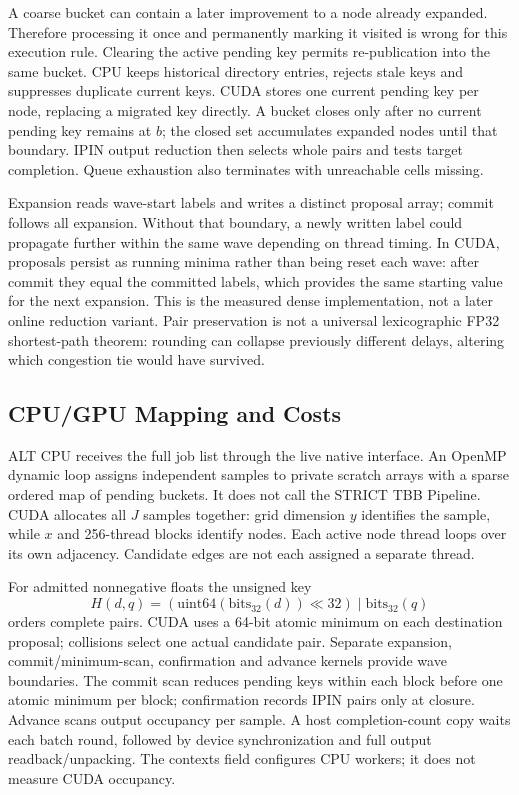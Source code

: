 A coarse bucket can contain a later improvement to a node already expanded. Therefore processing it once and permanently marking it visited is wrong for this execution rule. Clearing the active pending key permits re-publication into the same bucket. CPU keeps historical directory entries, rejects stale keys and suppresses duplicate current keys. CUDA stores one current pending key per node, replacing a migrated key directly. A bucket closes only after no current pending key remains at $b$; the closed set accumulates expanded nodes until that boundary. IPIN output reduction then selects whole pairs and tests target completion. Queue exhaustion also terminates with unreachable cells missing.

Expansion reads wave-start labels and writes a distinct proposal array; commit follows all expansion. Without that boundary, a newly written label could propagate further within the same wave depending on thread timing. In CUDA, proposals persist as running minima rather than being reset each wave: after commit they equal the committed labels, which provides the same starting value for the next expansion. This is the measured dense implementation, not a later online reduction variant. Pair preservation is not a universal lexicographic FP32 shortest-path theorem: rounding can collapse previously different delays, altering which congestion tie would have survived.

\subsection{CPU/GPU Mapping and Costs}
ALT CPU receives the full job list through the live native interface. An OpenMP dynamic loop assigns independent samples to private scratch arrays with a sparse ordered map of pending buckets. It does not call the STRICT TBB Pipeline. CUDA allocates all $J$ samples together: grid dimension $y$ identifies the sample, while $x$ and 256-thread blocks identify nodes. Each active node thread loops over its own adjacency. Candidate edges are not each assigned a separate thread.

For admitted nonnegative floats the unsigned key
\begin{equation}
 H(d,q)=(\mathrm{uint64}(\mathrm{bits}_{32}(d))\ll32)
          \mathbin{|}\mathrm{bits}_{32}(q)
\end{equation}
orders complete pairs. CUDA uses a 64-bit atomic minimum on each destination proposal; collisions select one actual candidate pair. Separate expansion, commit/minimum-scan, confirmation and advance kernels provide wave boundaries. The commit scan reduces pending keys within each block before one atomic minimum per block; confirmation records IPIN pairs only at closure. Advance scans output occupancy per sample. A host completion-count copy waits each batch round, followed by device synchronization and full output readback/unpacking. The contexts field configures CPU workers; it does not measure CUDA occupancy.

